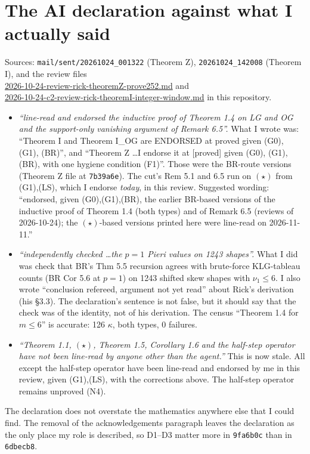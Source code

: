 \documentclass[11pt]{article}
\begin{document}
\section{The AI declaration against what I actually said}

Sources: \texttt{mail/sent/20261024\_001322} (Theorem Z),
\texttt{20261024\_142008} (Theorem I), and the review files\\
\url{2026-10-24-review-rick-theoremZ-prove252.md} and\\
\url{2026-10-24-c2-review-rick-theoremI-integer-window.md} in this repository.

\begin{itemize}[leftmargin=*]
\item[\textbf{D1}] \emph{``line-read and endorsed the inductive proof of Theorem 1.4 on LG and OG
and the support-only vanishing argument of Remark 6.5''.} What I wrote was: ``Theorem I and
Theorem I\_OG are ENDORSED at proved given (G0), (G1), (BR)'', and ``Theorem Z \ldots I endorse it
at [proved] given (G0), (G1), (BR), with one hygiene condition (F1)''. Those were the BR-route
versions (Theorem Z file at \texttt{7b39a6e}). The cut's Rem 5.1 and 6.5 run on $(\star)$ from
(G1),(LS), which I endorse \emph{today}, in this review. Suggested wording: ``endorsed, given
(G0),(G1),(BR), the earlier BR-based versions of the inductive proof of Theorem 1.4 (both types)
and of Remark 6.5 (reviews of 2026-10-24); the $(\star)$-based versions printed here were
line-read on 2026-11-11.''
\item[\textbf{D2}] \emph{``independently checked \ldots the $p=1$ Pieri values on 1243 shapes''.}
What I did was check that BR's Thm 5.5 recursion agrees with brute-force KLG-tableau counts (BR
Cor 5.6 at $p=1$) on 1243 shifted skew shapes with $\nu_1\le6$. I also wrote ``conclusion
refereed, argument not yet read'' about Rick's derivation (his \S3.3). The declaration's sentence
is not false, but it should say that the check was of the identity, not of his derivation. The
census ``Theorem 1.4 for $m\le6$'' is accurate: 126 $\kappa$, both types, 0 failures.
\item[\textbf{D3}] \emph{``Theorem 1.1, $(\star)$, Theorem 1.5, Corollary 1.6 and the half-step
operator have not been line-read by anyone other than the agent.''} This is now stale. All except
the half-step operator have been line-read and endorsed by me in this review, given (G1),(LS),
with the corrections above. The half-step operator remains unproved (N4).
\end{itemize}
The declaration does not overstate the mathematics anywhere else that I could find. The removal of
the acknowledgements paragraph leaves the declaration as the only place my role is described, so
D1--D3 matter more in \texttt{9fa6b0c} than in \texttt{6dbecb8}.
\end{document}
